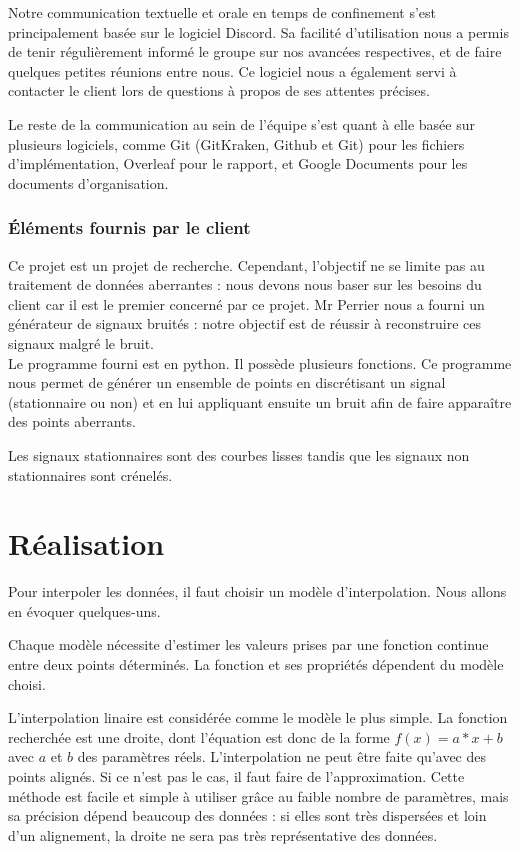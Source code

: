 \documentclass[a4paper,12pt]{article} %
\begin{document}
        Notre communication textuelle et orale en temps de confinement s'est principalement basée sur le logiciel Discord. Sa facilité d'utilisation nous a permis de tenir régulièrement informé le groupe sur nos avancées respectives, et de faire quelques petites réunions entre nous. Ce logiciel nous a également servi à contacter le client lors de questions à propos de ses attentes précises.
        
        Le reste de la communication au sein de l'équipe s'est quant à elle basée sur plusieurs logiciels, comme Git (GitKraken, Github et Git) pour les fichiers d'implémentation, Overleaf pour le rapport, et Google Documents pour les documents d'organisation.
        
	\section{Éléments fournis par le client}
	    Ce projet est un projet de recherche. Cependant, l'objectif ne se limite pas au traitement de données aberrantes : nous devons nous baser sur les besoins du client car il est le premier concerné par ce projet. Mr Perrier nous a fourni un générateur de signaux bruités : notre objectif est de réussir à reconstruire ces signaux malgré le bruit. \\
	    
	    Le programme fourni est en python. Il possède plusieurs fonctions. Ce programme nous permet de générer un ensemble de points en discrétisant un signal (stationnaire  ou non) et en lui appliquant ensuite un bruit afin de faire apparaître des points aberrants.
	    
	    Les signaux stationnaires sont des courbes lisses tandis que les signaux non stationnaires sont crénelés. 



\renewcommand\partname{}
\part{Réalisation}
	Pour interpoler les données, il faut choisir un modèle d'interpolation. Nous allons en évoquer quelques-uns. 
	
    Chaque modèle nécessite d'estimer les valeurs prises par une fonction continue entre deux points déterminés. La fonction et ses propriétés dépendent du modèle choisi. 
	
	L'interpolation linaire est considérée comme le modèle le plus simple. La fonction recherchée est une droite, dont l'équation est donc de la forme $f(x)=a*x+b$ avec $a$ et $b$ des paramètres réels. L'interpolation ne peut être faite qu'avec des points alignés. Si ce n'est pas le cas, il faut faire de l'approximation. Cette méthode est facile et simple à utiliser grâce au faible nombre de paramètres, mais sa précision dépend beaucoup des données : si elles sont très dispersées et loin d'un alignement, la droite ne sera pas très représentative des données.
	
\end{document}
